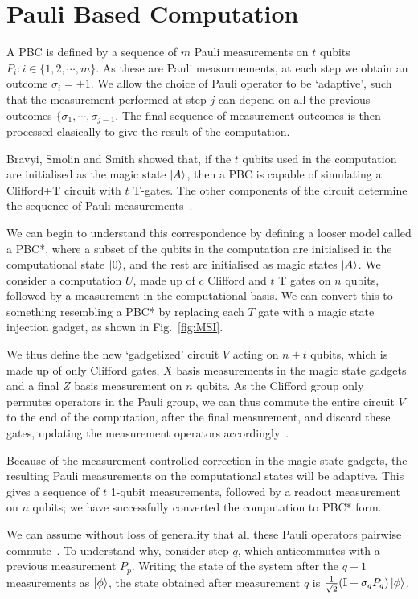 \documentclass{standalone}
\begin{document}
\section{Pauli Based Computation}\label{sec:pbc}
A PBC is defined by a sequence of $m$ Pauli measurements on $t$ qubits $P_{i}:i\in\{1,2,\cdots,m\}$. As these are Pauli measurmements, at each step we obtain an outcome $\sigma_{i}=\pm 1$. We allow the choice of Pauli operator to be `adaptive', such that the measurement performed at step $j$ can depend on all the previous outcomes $\{\sigma_{1},\cdots,\sigma_{j-1}$. The final sequence of measurement outcomes is then processed clasically to give the result of the computation. 
\par
Bravyi, Smolin and Smith showed that, if the $t$ qubits used in the computation are initialised as the magic state $\ket{A}$, then a PBC is capable of simulating a Clifford+T circuit with $t$ T-gates. The other components of the circuit determine the sequence of Pauli measurements~\cite{Bravyi2015}. 
\par
We can begin to understand this correspondence by defining a looser model called a PBC*, where a subset of the qubits in the computation are initialised in the computational state $\ket{0}$, and the rest are initialised as magic states $\ket{A}$. We consider a computation $U$, made up of $c$ Clifford and $t$ T gates on $n$ qubits, followed by a measurement in the computational basis. We can convert this to something resembling a PBC* by replacing each $T$ gate with a magic state injection gadget, as shown in Fig.~\ref{fig:MSI}. 
\par
We thus define the new `gadgetized' circuit $V$ acting on $n+t$ qubits, which is made up of only Clifford gates, $X$ basis measurements in the magic state gadgets and a final $Z$ basis measurement on $n$ qubits. As the Clifford group only permutes operators in the Pauli group, we can thus commute the entire circuit $V$ to the end of the computation, after the final measurement, and discard these gates, updating the measurement operators accordingly~\cite{Bravyi2015}. 
\par
Because of the measurement-controlled correction in the magic state gadgets, the resulting Pauli measurements on the computational states will be adaptive. This gives a sequence of $t$ 1-qubit measurements, followed by a readout measurement on $n$ qubits; we have successfully converted the computation to PBC* form. 
\par
We can assume without loss of generality that all these Pauli operators pairwise commute~\cite{Bravyi2015}. To understand why, consider step $q$, which anticommutes with a previous measurement $P_{p}$. Writing the state of the system after the $q-1$ measurements as $\ket{\phi}$, the state obtained after measurement $q$ is $\frac{1}{\sqrt{2}}(\mathbb{I}+\sigma_{q}P_{q})\ket{\phi}$.
\end{document}
